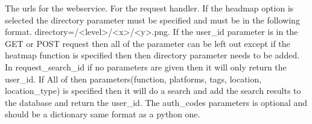 \documentclass[a4paper]{article}
\begin{document}
The urls for the webservice.
For the request handler.
If the headmap option is selected the directory parameter must be specified and
must be in the following format. directory=/<level>/<x>/<y>.png.
If the user_id parameter is in the GET or POST request then all of
the parameter can be left out except if the heatmap function is specified then 
then directory parameter needs to be added.
In request_search_id if no parameters are given then it will only return the
user_id. If All of then parameters(function, platforms, tags, location, location_type) is specified then it will do a search and add the search results to the database and return the user_id. The auth_codes parameters is optional and should be a dictionary same format as a python one.
\end{document}
